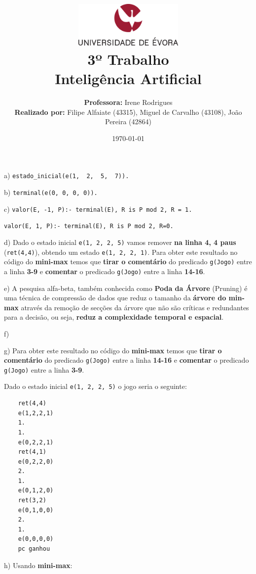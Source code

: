 \documentclass[11pt]{article}
\title
{
    \includegraphics[width=0.4\textwidth]{imgs/university.png}
    \\[0.1cm]
    \textbf{3º Trabalho} \\
    Inteligência Artificial
}
\author
{
    \textbf{Professora:} Irene Rodrigues \\
    \textbf{Realizado por:} Filipe Alfaiate (43315), Miguel de Carvalho (43108), João Pereira (42864) 
}
\date{\today}
\begin{document}
\maketitle

\section{}

\hspace{0,6cm}a) \verb|estado_inicial(e(1,  2,  5,  7)).|

b) \verb|terminal(e(0, 0, 0, 0)).|

c) \verb|valor(E, -1, P):- terminal(E), R is P mod 2, R = 1.|

\hspace{0,45cm}\verb|valor(E, 1, P):- terminal(E), R is P mod 2, R=0.|

d) Dado o estado inicial \verb|e(1, 2, 2, 5)| vamos remover \textbf{na linha 4, 4 paus}
(\verb|ret(4,4)|), obtendo um estado \verb|e(1, 2, 2, 1)|. Para obter este resultado no código
do \textbf{mini-max} temos que \textbf{tirar o comentário} do predicado \verb|g(Jogo)| entre a
linha \textbf{3-9} e \textbf{comentar} o predicado \verb|g(Jogo)| entre a linha \textbf{14-16}.

e) A pesquisa alfa-beta, também conhecida como \textbf{Poda da Árvore} (Pruning) é uma técnica
de compressão de dados que reduz o tamanho da \textbf{árvore do min-max} através da remoção de
secções da árvore que não são críticas e redundantes para a decisão, ou seja, \textbf{reduz a complexidade 
temporal e espacial}.

f)

g) Para obter este resultado no código do \textbf{mini-max} temos que \textbf{tirar o comentário}
do predicado \verb|g(Jogo)| entre a linha \textbf{14-16} e \textbf{comentar} o predicado
\verb|g(Jogo)| entre a linha \textbf{3-9}.

\hspace{0,45cm}Dado o estado inicial \verb|e(1, 2, 2, 5)| o jogo seria o seguinte:
\begin{lstlisting}
    ret(4,4)
    e(1,2,2,1)
    1.
    1.
    e(0,2,2,1)
    ret(4,1)
    e(0,2,2,0)
    2.
    1.
    e(0,1,2,0)
    ret(3,2)
    e(0,1,0,0)
    2.
    1.
    e(0,0,0,0)
    pc ganhou
\end{lstlisting}

\newpage

h) Usando \textbf{mini-max}:
\end{document}

